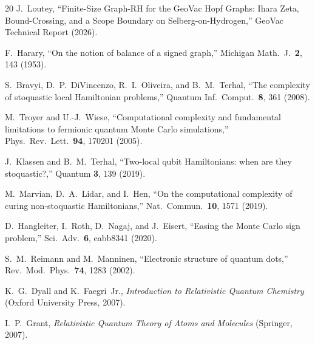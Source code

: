 \documentclass[twocolumn,pra,amsmath,amssymb,superscriptaddress]{revtex4-2}
\begin{document}
\begin{thebibliography}{20}
J.~Loutey,
``Finite-Size Graph-RH for the GeoVac Hopf Graphs: Ihara Zeta,
Bound-Crossing, and a Scope Boundary on Selberg-on-Hydrogen,''
GeoVac Technical Report (2026).

F.~Harary,
``On the notion of balance of a signed graph,''
Michigan Math.\ J.\ \textbf{2}, 143 (1953).

S.~Bravyi, D.~P.~DiVincenzo, R.~I.~Oliveira, and B.~M.~Terhal,
``The complexity of stoquastic local Hamiltonian problems,''
Quantum Inf.\ Comput.\ \textbf{8}, 361 (2008).

M.~Troyer and U.-J.~Wiese,
``Computational complexity and fundamental limitations to fermionic
quantum Monte Carlo simulations,''
Phys.\ Rev.\ Lett.\ \textbf{94}, 170201 (2005).

J.~Klassen and B.~M.~Terhal,
``Two-local qubit Hamiltonians: when are they stoquastic?,''
Quantum \textbf{3}, 139 (2019).

M.~Marvian, D.~A.~Lidar, and I.~Hen,
``On the computational complexity of curing non-stoquastic
Hamiltonians,''
Nat.\ Commun.\ \textbf{10}, 1571 (2019).

D.~Hangleiter, I.~Roth, D.~Nagaj, and J.~Eisert,
``Easing the Monte Carlo sign problem,''
Sci.\ Adv.\ \textbf{6}, eabb8341 (2020).

S.~M.~Reimann and M.~Manninen,
``Electronic structure of quantum dots,''
Rev.\ Mod.\ Phys.\ \textbf{74}, 1283 (2002).

K.~G.~Dyall and K.~Faegri~Jr.,
\textit{Introduction to Relativistic Quantum Chemistry}
(Oxford University Press, 2007).

I.~P.~Grant,
\textit{Relativistic Quantum Theory of Atoms and Molecules}
(Springer, 2007).

\end{thebibliography}
\end{document}
